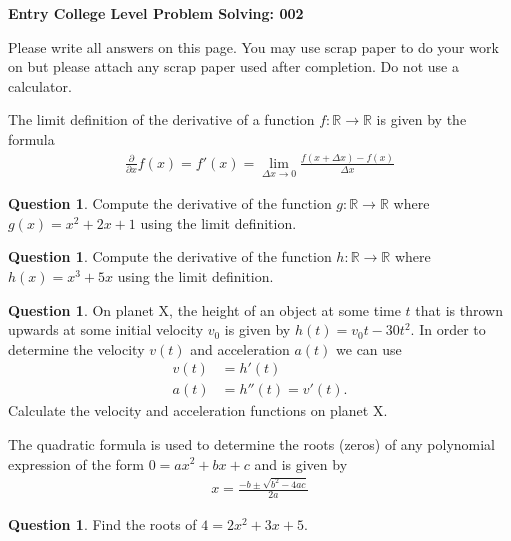 \documentclass[12pt]{article}
\theoremstyle{definition}
\newtheorem{question}[thm]{Question}
\def\real{{\mathbb R}}
\begin{document}
	\begin{center}
	{\LARGE \textbf{Entry College Level Problem Solving: 002}}\\
		\vspace{.6cm}
	\end{center}
	\begin{center}
		Please write all answers on this page. You may use scrap paper to do your work on but please attach any scrap paper used after completion. Do not use a calculator.
	\end{center}
	
	The limit definition of the derivative of a function $f: \real \rightarrow \real$ is given by the formula
	\begin{align}
	\frac{\partial}{\partial x}f(x) = f'(x)= \lim\limits_{\Delta x \rightarrow 0} \frac{f(x+\Delta x)-f(x)}{\Delta x}
	\end{align}
\begin{question}
	Compute the derivative of the function $g: \real \rightarrow \real$ where $g(x)=x^2+2x+1$ using the limit definition.
\end{question}

\vspace{3 cm}

\begin{question}
	Compute the derivative of the function $h: \real \rightarrow \real$ where $h(x)=x^3+5x$ using the limit definition.
\end{question}

\vspace{3cm}


\begin{question}
	On planet X, the height of an object at some time $t$ that is thrown upwards at some initial velocity $v_0$ is given by $h(t)=v_0t-30t^2$. In order to determine the velocity $v(t)$ and acceleration $a(t)$ we can use
	\begin{align}
	v(t)&=h'(t) \\
	a(t)&=h''(t) = v'(t).
	\end{align}
	Calculate the velocity and acceleration functions on planet X.
\end{question}


\newpage
The quadratic formula is used to determine the roots (zeros) of any polynomial expression of the form $0=ax^2+bx+c$ and is given by
\begin{align}
x=\frac{-b\pm\sqrt{b^2-4ac}}{2a}
\end{align}
\begin{question}
	Find the roots of $4=2x^2+3x+5$.
\end{question}
\end{document}
